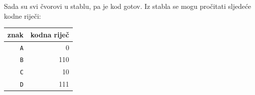 Sada su svi čvorovi u stablu, pa je kod gotov.
Iz stabla se mogu pročitati sljedeće kodne riječi:
\begin{center}
\begin{tabular}{rr}
znak & kodna riječ \\
\hline
\texttt{A} & 0 \\
\texttt{B} & 110 \\
\texttt{C} & 10 \\
\texttt{D} & 111 \\
\end{tabular}
\end{center}
